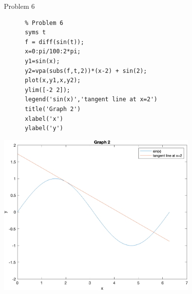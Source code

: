 \documentclass[10pt]{extarticle}
\begin{document}
  \begin{problem}{Problem 6}
    \begin{lstlisting}
      % Problem 6
      syms t
      f = diff(sin(t));
      x=0:pi/100:2*pi;
      y1=sin(x);
      y2=vpa(subs(f,t,2))*(x-2) + sin(2);
      plot(x,y1,x,y2);
      ylim([-2 2]);
      legend('sin(x)','tangent line at x=2')
      title('Graph 2')
      xlabel('x')
      ylabel('y')
    \end{lstlisting}
    \begin{center}
      \includegraphics[width=10cm]{problem_6}
    \end{center}
  \end{problem}
\end{document}
